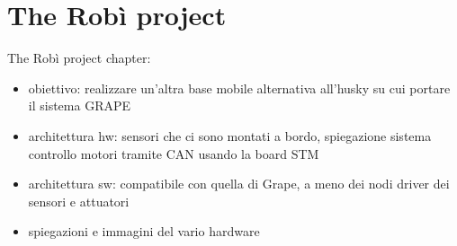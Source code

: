 
\chapter{The Robì project} \label{chap:robìProject}

The Robì project chapter:

\begin{itemize}
	\item obiettivo: realizzare un'altra base mobile alternativa all'husky su cui portare il sistema GRAPE
	\item architettura hw: sensori che ci sono montati a bordo, spiegazione sistema controllo motori tramite CAN usando la board STM
	\item architettura sw: compatibile con quella di Grape, a meno dei nodi driver dei sensori e attuatori
	\item spiegazioni e immagini del vario hardware
\end{itemize}

